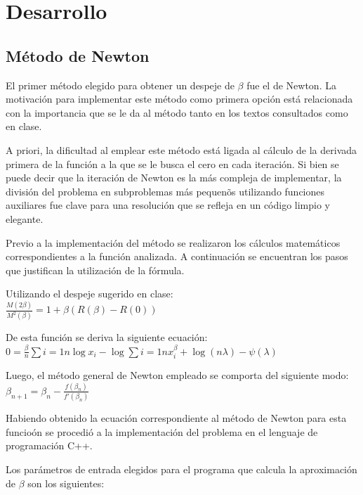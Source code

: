 \section{Desarrollo}

\subsection{M\'etodo de Newton}

El primer m\'etodo elegido para obtener un despeje de $\beta$ fue el de Newton. La motivaci\'on para implementar este m\'etodo como primera opci\'on est\'a relacionada con la importancia que se le da al m\'etodo tanto en los textos consultados como en clase.

A priori, la dificultad al emplear este m\'etodo est\'a ligada al c\'alculo de la derivada primera de la funci\'on a la que se le busca el cero en cada iteraci\'on. Si bien se puede decir que la iteraci\'on de Newton es la m\'as compleja de implementar, la divisi\'on del problema en subproblemas m\'as pequen\~os utilizando funciones auxiliares fue clave para una resoluci\'on que se refleja en un c\'odigo limpio y elegante.


Previo a la implementaci\'on del m\'etodo se realizaron los c\'alculos matem\'aticos correspondientes a la funci\'on analizada. A continuaci\'on se encuentran los pasos que justifican la utilizaci\'on de la f\'ormula.

Utilizando el despeje sugerido en clase:\\

$\frac{M(2\beta)}{M^2(\beta)}=1 + \beta(R(\beta)-R(0))$

De esta funci\'on se deriva la siguiente ecuaci\'on: \\

$0 = \frac{\beta}{n}\sum{i=1}{n}\log x_i - \log \sum{i=1}{n}x_i^{\beta} + \log(n\lambda)-\psi(\lambda)$

Luego, el m\'etodo general de Newton empleado se comporta del siguiente modo: \\

$\beta_{n+1} = \beta_{n} - \frac{f(\beta_{n})}{f'(\beta_{n})}$

Habiendo obtenido la ecuaci\'on correspondiente al m\'etodo de Newton para esta funcio\'on se procedi\'o a la implementaci\'on del problema en el lenguaje de programaci\'on C++.

Los par\'ametros de entrada elegidos para el programa que calcula la aproximaci\'on de $\beta$ son los siguientes:

